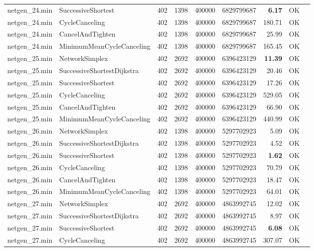 \begin{longtable}{llrrrrrrl}
netgen\_24.min & SuccessiveShortest & 402 & 1398 & 400000 & 6829799687 & \textbf{6.17} & OK \\
netgen\_24.min & CycleCanceling & 402 & 1398 & 400000 & 6829799687 & 180.71 & OK \\
netgen\_24.min & CancelAndTighten & 402 & 1398 & 400000 & 6829799687 & 25.99 & OK \\
netgen\_24.min & MinimumMeanCycleCanceling & 402 & 1398 & 400000 & 6829799687 & 165.45 & OK \\
\midrule
netgen\_25.min & NetworkSimplex & 402 & 2692 & 400000 & 6396423129 & \textbf{11.39} & OK \\
netgen\_25.min & SuccessiveShortestDijkstra & 402 & 2692 & 400000 & 6396423129 & 20.46 & OK \\
netgen\_25.min & SuccessiveShortest & 402 & 2692 & 400000 & 6396423129 & 17.26 & OK \\
netgen\_25.min & CycleCanceling & 402 & 2692 & 400000 & 6396423129 & 529.05 & OK \\
netgen\_25.min & CancelAndTighten & 402 & 2692 & 400000 & 6396423129 & 66.90 & OK \\
netgen\_25.min & MinimumMeanCycleCanceling & 402 & 2692 & 400000 & 6396423129 & 440.99 & OK \\
\midrule
netgen\_26.min & NetworkSimplex & 402 & 1398 & 400000 & 5297702923 & 5.09 & OK \\
netgen\_26.min & SuccessiveShortestDijkstra & 402 & 1398 & 400000 & 5297702923 & 4.52 & OK \\
netgen\_26.min & SuccessiveShortest & 402 & 1398 & 400000 & 5297702923 & \textbf{1.62} & OK \\
netgen\_26.min & CycleCanceling & 402 & 1398 & 400000 & 5297702923 & 70.79 & OK \\
netgen\_26.min & CancelAndTighten & 402 & 1398 & 400000 & 5297702923 & 18.47 & OK \\
netgen\_26.min & MinimumMeanCycleCanceling & 402 & 1398 & 400000 & 5297702923 & 64.01 & OK \\
\midrule
netgen\_27.min & NetworkSimplex & 402 & 2692 & 400000 & 4863992745 & 12.02 & OK \\
netgen\_27.min & SuccessiveShortestDijkstra & 402 & 2692 & 400000 & 4863992745 & 8.97 & OK \\
netgen\_27.min & SuccessiveShortest & 402 & 2692 & 400000 & 4863992745 & \textbf{6.08} & OK \\
netgen\_27.min & CycleCanceling & 402 & 2692 & 400000 & 4863992745 & 307.07 & OK \\

\end{longtable}
